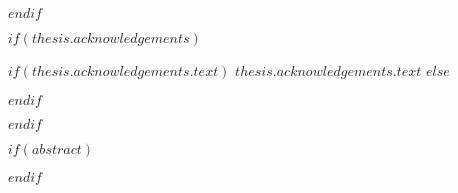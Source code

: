 $endif$

$if(thesis.acknowledgements)$

\begin{acknowledgements}
\begin{singlespace}

\setlength\parindent{0pt}

\addchaptertocentry{\acknowledgementname} %
$if(thesis.acknowledgements.text)$
$thesis.acknowledgements.text$
$else$

$endif$
\end{singlespace}
\end{acknowledgements}

$endif$

$if(abstract)$

\begin{abstract}
\begin{singlespace}

\setlength\parindent{0pt}

\addchaptertocentry{\abstractname} %
{$abstract$}\vspace{0.3cm}

{Palabras clave: }{\keywordnames}%
\end{singlespace}
\end{abstract}

$endif$




% 
\tableofcontents %

\listoffigures %

% 

